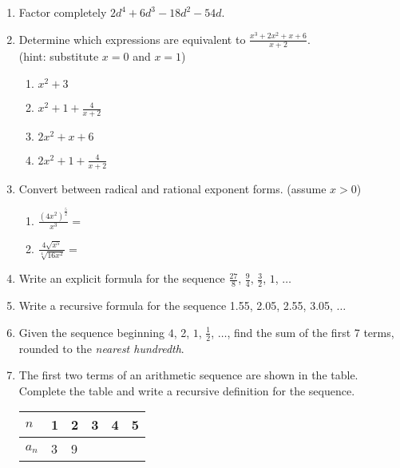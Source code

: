 \documentclass[12pt, twoside]{article}
\begin{document}
\begin{enumerate}[itemsep=0.5cm]
\newpage
\item Factor completely $2d^4+6d^3-18d^2-54d$. \vspace{4cm}

\item Determine which expressions are equivalent to $\displaystyle \frac{x^3+2x^2+x+6}{x+2}$. \\[0.25cm]
    (hint: substitute $x=0$ and $x=1$)
    \begin{multicols}{2}
    \begin{enumerate}
        \item $x^2+3$
        \item $\displaystyle x^2+1 +\frac{4}{x+2}$
        \item $2x^2+x+6$
        \item $\displaystyle 2x^2+1 + \frac{4}{x+2}$
    \end{enumerate}
    \end{multicols} \vspace{3cm}

\item Convert between radical and rational exponent forms. (assume $x > 0$)
    \begin{multicols}{2}
    \begin{enumerate}
        \item $\displaystyle \frac{(4x^2)^{\frac{5}{2}}}{x^{3}} =$
        \item $\displaystyle \frac{4\sqrt{x^5}}{\sqrt[4]{16x^2}} = $
    \end{enumerate}
    \end{multicols} \vspace{2cm}

\newpage
\item Write an explicit formula for the sequence $\frac{27}{8}$, $\frac{9}{4}$, $\frac{3}{2}$, $1$, $\ldots$ \vspace{3cm}

\item Write a recursive formula for the sequence 1.55, 2.05, 2.55, 3.05, $\ldots$ \vspace{3cm}


\item Given the sequence beginning  $4$, 2, $1$, $\frac{1}{2}$, $\ldots$, find the sum of the first 7 terms, rounded to the \emph{nearest hundredth}. \vspace{3cm}

\item The first two terms of an arithmetic sequence are shown in the table. Complete the table and write a recursive definition for the sequence.
\begin{center}
\begin{tabular}{|p{1cm}|p{1cm}|p{1cm}|p{1cm}|p{1cm}|p{1cm}|}
    \hline
    $n$ & 1 & 2 & 3 & 4 & 5 \\
    \hline
    $a_n$ & 3 & 9 & & & \\[0.25cm]
    \hline
\end{tabular}
\end{center}


\end{enumerate}
\end{document}
